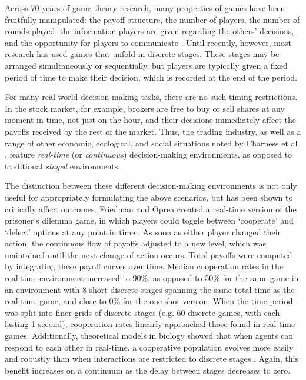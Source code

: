 \documentclass[10pt,letterpaper]{article}
\begin{document}
Across 70 years of game theory research, many properties of games have been fruitfully manipulated: the payoff structure, the number of players, the number of rounds played, the information players are given regarding the others' decisions, and the opportunity for players to communicate \cite{VonNeumannMorgenstern07_TheoryOfGames, Kreps90, Rasmusen06}. Until recently, however, most research has used games that unfold in discrete stages. These stages may be arranged simultaneously or sequentially, but players are typically given a fixed period of time to make their decision, which is recorded at the end of the period. 

For many real-world decision-making tasks, there are no such timing restrictions. In the stock market, for example, brokers are free to buy or sell shares at any moment in time, not just on the hour, and their decisions immediately affect the payoffs received by the rest of the market. Thus, the trading industry, as well as a range of other economic, ecological, and social situations noted by Charness et al \cite{OpreaCharnessFriedman14_ContinuousTime}, feature \emph{real-time} (or \emph{continuous}) decision-making environments, as opposed to traditional \emph{staged} environments. 

The distinction between these different decision-making environments is not only useful for appropriately formulating the above scenarios, but has been shown to critically affect outcomes. Friedman and Oprea created a real-time version of the prisoner's dilemma game, in which players could toggle between `cooperate' and `defect' options at any point in time \cite{FriedmanOprea12_ContinuousDilemma}. As soon as either player changed their action, the continuous flow of payoffs adjusted to a new level, which was maintained until the next change of action occurs. Total payoffs were computed by integrating these payoff curves over time. Median cooperation rates in the real-time environment increased to 90\%, as opposed to 50\% for the same game in an environment with 8 short discrete stages spanning the same total time as the real-time game, and close to 0\% for the one-shot version. When the time period was split into finer grids of discrete stages (e.g. 60 discrete games, with each lasting 1 second), cooperation rates linearly approached those found in real-time games.  Additionally, theoretical models in biology showed that when agents can respond to each other in real-time, a cooperative population evolves more easily and robustly than when interactions are restricted to discrete stages \cite{vanDoornRiebliTaborsky14_CoactionReciprocityContinuousTime}. Again, this benefit increases on a continuum as the delay between stages decreases to zero. 
\end{document}
